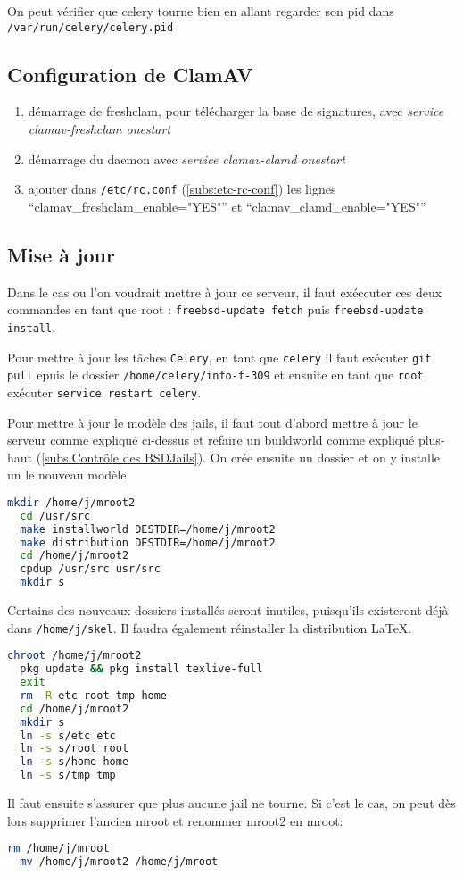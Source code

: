 \documentclass[10pt,a4paper]{article}
\begin{document}
On peut vérifier que celery tourne bien en allant regarder son pid dans \texttt{/var/run/celery/celery.pid}

\subsection{Configuration de ClamAV}
\begin{enumerate}
  \item démarrage de freshclam, pour télécharger la base de signatures, avec \emph{service clamav-freshclam onestart}
  \item démarrage du daemon avec \emph{service clamav-clamd onestart}
  \item ajouter dans \texttt{/etc/rc.conf} (\ref{subs:etc-rc-conf}) les lignes ``clamav\_freshclam\_enable="YES"'' et ``clamav\_clamd\_enable="YES"''
\end{enumerate}

\subsection{Mise à jour}

Dans le cas ou l'on voudrait mettre à jour ce serveur,
il faut exéccuter ces deux commandes en tant que root :
\texttt{freebsd-update fetch} puis \texttt{freebsd-update install}.

Pour mettre à jour les tâches \texttt{Celery},
en tant que \texttt{celery} il faut exécuter \texttt{git pull}
epuis le dossier \texttt{/home/celery/info-f-309}
et ensuite en tant que \texttt{root} exécuter \texttt{service restart celery}.

Pour mettre à jour le modèle des jails, il faut tout d'abord mettre à jour le serveur comme expliqué ci-dessus et refaire un buildworld comme expliqué plus-haut (\ref{subs:Contrôle des BSDJails}). On crée ensuite un dossier et on y installe un le nouveau modèle.
\begin{lstlisting}[language=bash]
  mkdir /home/j/mroot2
  cd /usr/src
  make installworld DESTDIR=/home/j/mroot2
  make distribution DESTDIR=/home/j/mroot2
  cd /home/j/mroot2
  cpdup /usr/src usr/src
  mkdir s
\end{lstlisting}
Certains des nouveaux dossiers installés seront inutiles, puisqu'ils existeront déjà dans \texttt{/home/j/skel}. Il faudra également réinstaller la distribution \LaTeX.
\begin{lstlisting}[language=bash]
  chroot /home/j/mroot2
  pkg update && pkg install texlive-full
  exit
  rm -R etc root tmp home
  cd /home/j/mroot2
  mkdir s
  ln -s s/etc etc
  ln -s s/root root
  ln -s s/home home
  ln -s s/tmp tmp
\end{lstlisting}
Il faut ensuite s'assurer que plus aucune jail ne tourne. Si c'est le cas, on peut dès lors supprimer l'ancien mroot et renommer mroot2 en mroot:
\begin{lstlisting}[language=bash]
  rm /home/j/mroot
  mv /home/j/mroot2 /home/j/mroot
\end{lstlisting}
\end{document}
